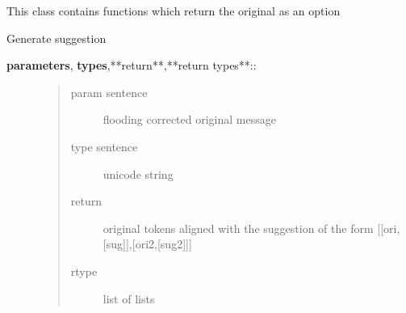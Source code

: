\documentclass[letterpaper,10pt,english]{sphinxmanual}
\begin{document}
\label{API:module-norm.modules.original}

\begin{fulllineitems}
\label{API:norm.modules.original.Original}
This class contains functions which return the original
as an option

\begin{fulllineitems}
\label{API:norm.modules.original.Original.generate_alternatives}
Generate suggestion
\begin{description}
\item[{\textbf{parameters}, \textbf{types},**return**,**return types**::}] \leavevmode\begin{quote}\begin{description}
\item[{param sentence}] \leavevmode
flooding corrected original message

\item[{type sentence}] \leavevmode
unicode string

\item[{return}] \leavevmode
original tokens aligned with the suggestion of the form {[}{[}ori,{[}sug{]}{]},{[}ori2,{[}sug2{]}{]}{]}

\item[{rtype}] \leavevmode
list of lists

\end{description}\end{quote}

\end{description}

\end{fulllineitems}


\end{fulllineitems}

\label{API:module-norm.modules.phonemic}
\end{document}

